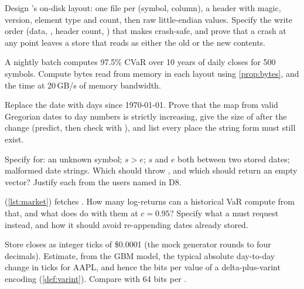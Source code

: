 \begin{exercises}
 Design 's on-disk layout: one file per (symbol, column), a header with magic,
version, element type and count, then raw little-endian values. Specify the write order (data, , header count,
) that makes  crash-safe, and prove that a crash at any point leaves a store that  reads as
either the old or the new contents.

 A nightly batch computes 97.5\% CVaR over 10 years of daily closes for 500 symbols. Compute bytes
read from memory in each layout using \cref{prop:bytes}, and the time at 20\,GB/s of memory bandwidth.

 Replace the  date with  days since 1970-01-01. Prove that the map from
valid Gregorian dates to day numbers is strictly increasing, give the size of  after the change (predict, then
check with ), and list every place the string form must still exist.

 Specify  for: an unknown symbol; $s>e$; $s$ and $e$ both between two stored dates;
malformed date strings. Which should throw , and which should return an empty vector? Justify each
from the users named in D8.

  (\cref{lst:market}) fetches . How many log-returns can a
historical VaR compute from that, and what does  do with them at $c=0.95$? Specify what a
 must request instead, and how it should avoid re-appending dates already stored.

 Store closes as integer ticks of \$0.0001 (the mock generator rounds to four decimals). Estimate,
from the GBM model, the typical absolute day-to-day change in ticks for AAPL, and hence the bits per value of a
delta-plus-varint encoding (\cref{def:varint}). Compare with 64 bits per .
\end{exercises}

